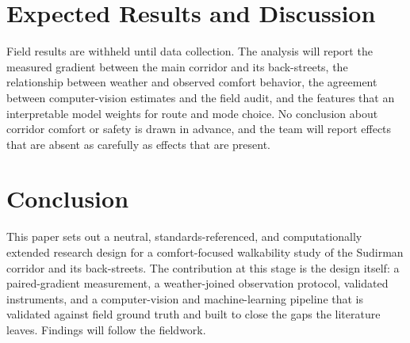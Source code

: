 \documentclass[conference]{IEEEtran}
\begin{document}
\section{Expected Results and Discussion}
Field results are withheld until data collection. The analysis will report the measured gradient
between the main corridor and its back-streets, the relationship between weather and observed
comfort behavior, the agreement between computer-vision estimates and the field audit, and the
features that an interpretable model weights for route and mode choice. No conclusion about
corridor comfort or safety is drawn in advance, and the team will report effects that are absent
as carefully as effects that are present.

\section{Conclusion}
This paper sets out a neutral, standards-referenced, and computationally extended research design
for a comfort-focused walkability study of the Sudirman corridor and its back-streets. The
contribution at this stage is the design itself: a paired-gradient measurement, a weather-joined
observation protocol, validated instruments, and a computer-vision and machine-learning pipeline
that is validated against field ground truth and built to close the gaps the literature leaves.
Findings will follow the fieldwork.

\printbibliography
\end{document}
